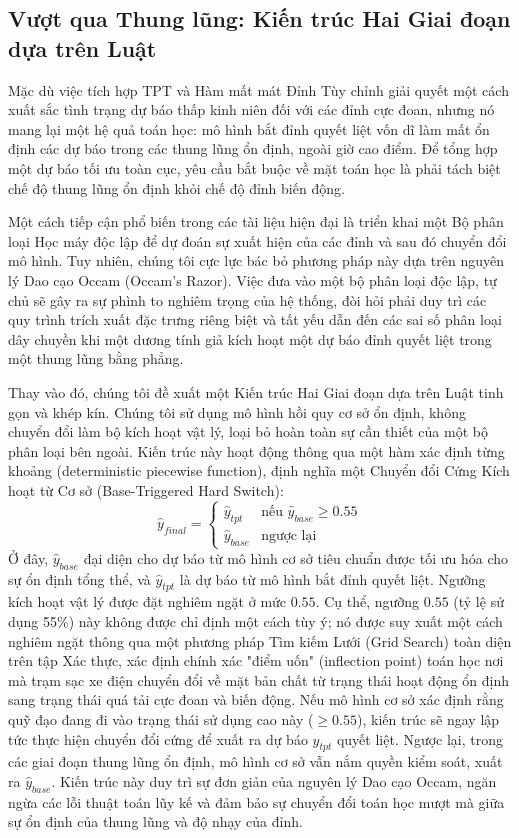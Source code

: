 \documentclass[pdflatex,sn-mathphys-num]{sn-jnl}%
\theoremstyle{thmstyleone}%
\theoremstyle{thmstyletwo}%
\theoremstyle{thmstylethree}%
\begin{document}
\subsection{Vượt qua Thung lũng: Kiến trúc Hai Giai đoạn dựa trên Luật}\label{subsec2_4}

Mặc dù việc tích hợp TPT và Hàm mất mát Đỉnh Tùy chỉnh giải quyết một cách xuất sắc tình trạng dự báo thấp kinh niên đối với các đỉnh cực đoan, nhưng nó mang lại một hệ quả toán học: mô hình bắt đỉnh quyết liệt vốn dĩ làm mất ổn định các dự báo trong các thung lũng ổn định, ngoài giờ cao điểm. Để tổng hợp một dự báo tối ưu toàn cục, yêu cầu bắt buộc về mặt toán học là phải tách biệt chế độ thung lũng ổn định khỏi chế độ đỉnh biến động. 

Một cách tiếp cận phổ biến trong các tài liệu hiện đại là triển khai một Bộ phân loại Học máy độc lập để dự đoán sự xuất hiện của các đỉnh và sau đó chuyển đổi mô hình. Tuy nhiên, chúng tôi cực lực bác bỏ phương pháp này dựa trên nguyên lý Dao cạo Occam (Occam's Razor). Việc đưa vào một bộ phân loại độc lập, tự chủ sẽ gây ra sự phình to nghiêm trọng của hệ thống, đòi hỏi phải duy trì các quy trình trích xuất đặc trưng riêng biệt và tất yếu dẫn đến các sai số phân loại dây chuyền khi một dương tính giả kích hoạt một dự báo đỉnh quyết liệt trong một thung lũng bằng phẳng. 

Thay vào đó, chúng tôi đề xuất một Kiến trúc Hai Giai đoạn dựa trên Luật tinh gọn và khép kín. Chúng tôi sử dụng mô hình hồi quy cơ sở ổn định, không chuyển đổi làm bộ kích hoạt vật lý, loại bỏ hoàn toàn sự cần thiết của một bộ phân loại bên ngoài. Kiến trúc này hoạt động thông qua một hàm xác định từng khoảng (deterministic piecewise function), định nghĩa một Chuyển đổi Cứng Kích hoạt từ Cơ sở (Base-Triggered Hard Switch):
\begin{equation}
\hat{y}_{final} = 
\begin{cases} 
\hat{y}_{tpt} & \text{nếu } \hat{y}_{base} \ge 0.55 \\ 
\hat{y}_{base} & \text{ngược lại} 
\end{cases}
\end{equation}
Ở đây, $\hat{y}_{base}$ đại diện cho dự báo từ mô hình cơ sở tiêu chuẩn được tối ưu hóa cho sự ổn định tổng thể, và $\hat{y}_{tpt}$ là dự báo từ mô hình bắt đỉnh quyết liệt. Ngưỡng kích hoạt vật lý được đặt nghiêm ngặt ở mức $0.55$. Cụ thể, ngưỡng $0.55$ (tỷ lệ sử dụng 55\%) này không được chỉ định một cách tùy ý; nó được suy xuất một cách nghiêm ngặt thông qua một phương pháp Tìm kiếm Lưới (Grid Search) toàn diện trên tập Xác thực, xác định chính xác "điểm uốn" (inflection point) toán học nơi mà trạm sạc xe điện chuyển đổi về mặt bản chất từ trạng thái hoạt động ổn định sang trạng thái quá tải cực đoan và biến động. Nếu mô hình cơ sở xác định rằng quỹ đạo đang đi vào trạng thái sử dụng cao này ($\ge 0.55$), kiến trúc sẽ ngay lập tức thực hiện chuyển đổi cứng để xuất ra dự báo $\hat{y}_{tpt}$ quyết liệt. Ngược lại, trong các giai đoạn thung lũng ổn định, mô hình cơ sở vẫn nắm quyền kiểm soát, xuất ra $\hat{y}_{base}$. Kiến trúc này duy trì sự đơn giản của nguyên lý Dao cạo Occam, ngăn ngừa các lỗi thuật toán lũy kế và đảm bảo sự chuyển đổi toán học mượt mà giữa sự ổn định của thung lũng và độ nhạy của đỉnh.
\end{document}
